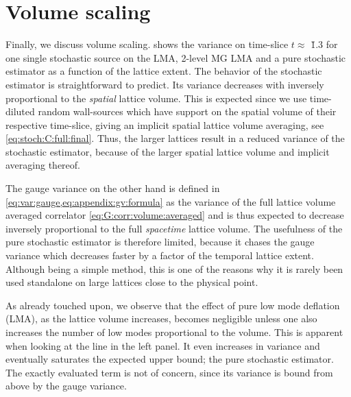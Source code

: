 
\section{Volume scaling}
\label{sec:numerics:volume:scaling}

Finally, we discuss volume scaling.
 shows the variance on time-slice $t \approx $ \u{1.3}{\femto \metre} for one single stochastic source on the LMA, 2-level MG LMA and a pure stochastic estimator as a function of the lattice extent.
The behavior of the stochastic estimator is straightforward to predict.
Its variance decreases with inversely proportional to the \textit{spatial} lattice volume.
This is expected since we use time-diluted random wall-sources which have support on the spatial volume of their respective time-slice, giving an implicit spatial lattice volume averaging, see \cref{eq:stoch:C:full:final}.
Thus, the larger lattices result in a reduced variance of the stochastic estimator, because of the larger spatial lattice volume and implicit averaging thereof.

The gauge variance on the other hand is defined in \cref{eq:var:gauge,eq:appendix:gv:formula} as the variance of the full lattice volume averaged correlator \cref{eq:G:corr:volume:averaged} and is thus expected to decrease inversely proportional to the full \textit{spacetime} lattice volume.
The usefulness of the pure stochastic estimator is therefore limited, because it chases the gauge variance which decreases faster by a factor of the temporal lattice extent.
Although being a simple method, this is one of the reasons why it is rarely been used standalone on large lattices close to the physical point.

As already touched upon, we observe that the effect of pure low mode deflation (LMA), as the lattice volume increases, becomes negligible unless one also increases the number of low modes proportional to the volume.
This is apparent when looking at the  line in the left panel.
It even increases in variance and eventually saturates the expected upper bound; the pure stochastic estimator.
The exactly evaluated  term is not of concern, since its variance is bound from above by the gauge variance.

